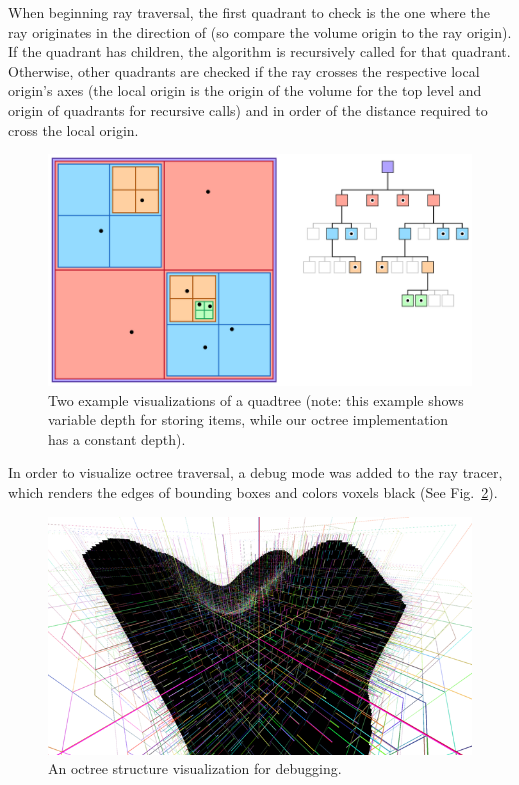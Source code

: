\documentclass[conference]{IEEEtran}
\begin{document}
When beginning ray traversal, the first quadrant to check is the one where the ray originates in the direction of (so compare the volume origin to the ray origin).
If the quadrant has children, the algorithm is recursively called for that quadrant.
Otherwise, other quadrants are checked if the ray crosses the respective local origin's axes (the local origin is the origin of the volume for the top level and origin of quadrants for recursive calls) and in order of the distance required to cross the local origin.

\begin{figure}[htbp]
\centerline{\includegraphics[width=\linewidth]{quadtree}}
\caption{Two example visualizations of a quadtree (note: this example shows variable depth for storing items, while our octree implementation has a constant depth).}
\label{quadtree}
\end{figure}

In order to visualize octree traversal, a debug mode was added to the ray tracer, which renders the edges of bounding boxes and colors voxels black (See Fig.~\ref{debug}).

\begin{figure}[htbp]
\centerline{\includegraphics[width=\linewidth]{debug}}
\caption{An octree structure visualization for debugging.}
\label{debug}
\end{figure}
\end{document}
